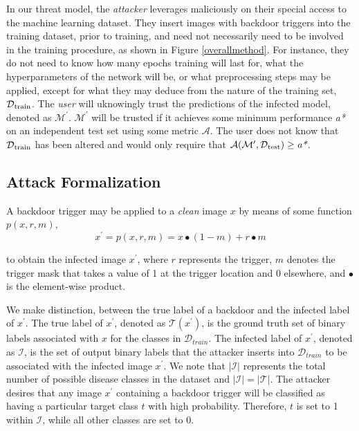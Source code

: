 \documentclass[letterpaper]{article} %
\begin{document}
In our threat model, the \textit{attacker} leverages maliciously  on their special access to the machine learning dataset. They  insert images with backdoor triggers into the training dataset, prior to training, and need not necessarily need to be involved in the training procedure, as shown in Figure \ref{overallmethod}. For instance, they do not need to know how many epochs training will last for, what the hyperparameters of the network will be, or what preprocessing steps may be applied, except for what they may deduce from the nature of the training set, $\mathcal{D}\textsubscript{train}$. The \textit{user} will uknowingly trust the predictions of the infected model, denoted as $\mathcal{M}^\prime$. $\mathcal{M}^\prime$ will be trusted if it achieves some minimum performance \emph{a*} on an independent test set using some metric $\mathcal{A}$. The user does not know that $\mathcal{D}\textsubscript{train}$ has been altered and would only require that $\mathcal{A} (
{\mathcal{M}^\prime}, \mathcal{D}\textsubscript{test}) \geq \emph{a*} $. 
 
\subsection{Attack Formalization}
A backdoor trigger may be applied to a \textit{clean} image $x$ by means of some function $ p(x, r, m) $,
 $$ x^\prime =  p(x, r, m) = x \bullet (1-m) + r\bullet m $$
 
\noindent
 to obtain the infected image $x^\prime$, where $r$ represents the trigger, $m$ denotes the trigger mask that takes a value of 1 at the trigger location and 0 elsewhere, and $\bullet$ is the element-wise product. 
 
We make  distinction, between the true label of a backdoor and the infected label of ${x^\prime}$. The true label of ${x^\prime}$, denoted as $\mathcal{T}(x^\prime)$, is the ground truth set of binary labels associated with ${x}$ for the classes in $\mathcal{D}_{train}$. The infected label of ${x^\prime}$, denoted as $\mathcal{I}$, is the set of output binary labels that the attacker inserts into $\mathcal{D}_{train}$ to be associated with the infected image ${x^\prime}$. We note that $|\mathcal{I}|$ represents the total number of possible disease classes in the dataset and $|\mathcal{I}|=|\mathcal{T}|$. The attacker desires that any image ${x^\prime}$ containing a backdoor trigger will be classified as having a particular target class $t$ with high probability. Therefore, $t$ is set to 1 within $\mathcal{I}$, while all other classes are set to 0. 
 
\end{document}
